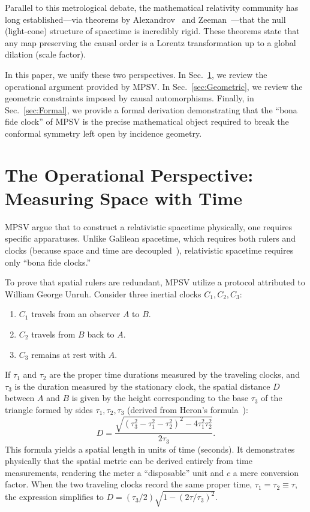 \documentclass[aps,prd,twocolumn,nofootinbib,superscriptaddress]{revtex4-2}
\begin{document}
Parallel to this metrological debate, the mathematical relativity community has long established---via theorems by Alexandrov~\cite{alex3} and Zeeman~\cite{Zeeman}---that the null (light-cone) structure of spacetime is incredibly rigid. These theorems state that any map preserving the causal order is a Lorentz transformation up to a global dilation (scale factor).

In this paper, we unify these two perspectives. In Sec.~\ref{sec:Operational}, we review the operational argument provided by MPSV. In Sec.~\ref{sec:Geometric}, we review the geometric constraints imposed by causal automorphisms. Finally, in Sec.~\ref{sec:Formal}, we provide a formal derivation demonstrating that the ``bona fide clock'' of MPSV is the precise mathematical object required to break the conformal symmetry left open by incidence geometry.

\section{The Operational Perspective: Measuring Space with Time}
\label{sec:Operational}

MPSV argue that to construct a relativistic spacetime physically, one requires specific apparatuses. Unlike Galilean spacetime, which requires both rulers and clocks (because space and time are decoupled~\cite{matsas-2024}), relativistic spacetime requires only ``bona fide clocks.''

To prove that spatial rulers are redundant, MPSV utilize a protocol attributed to William George Unruh. Consider three inertial clocks $C_1, C_2, C_3$:
\begin{enumerate}
    \item $C_1$ travels from an observer $A$ to $B$.
    \item $C_2$ travels from $B$ back to $A$.
    \item $C_3$ remains at rest with $A$.
\end{enumerate}
If $\tau_1$ and $\tau_2$ are the proper time durations measured by the traveling clocks, and $\tau_3$ is the duration measured by the stationary clock,
the spatial distance $D$ between $A$ and $B$ is given by the height corresponding to the base $\tau_3$ of the triangle formed by sides $\tau_1, \tau_2, \tau_3$ (derived from Heron's formula~\cite{matsas-2024}):
\begin{equation}
D =  \frac{\sqrt{(\tau_3^2 - \tau_1^2 - \tau_2^2)^2 - 4\tau_1^2\tau_2^2}}{2\tau_3}.
\label{eq:Unruh}
\end{equation}
This formula yields a spatial length in units of time (seconds). It demonstrates physically that the spatial metric can be derived entirely from time measurements, rendering the meter a ``disposable'' unit and $c$ a mere conversion factor.
When the two traveling clocks record the same proper time, $\tau_1 = \tau_2 \equiv \tau$, the expression simplifies to
$
D = (\tau_3/2) \sqrt{1 - \left(2\tau/\tau_3\right)^2}
$.
\end{document}
